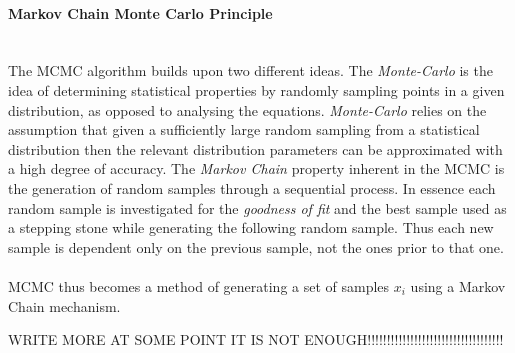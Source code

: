\documentclass[a4paper, 12pt, twoside]{article}
\begin{document}
\paragraph{Markov Chain Monte Carlo Principle}\mbox{}\\
The MCMC algorithm builds upon two different ideas. The \emph{Monte-Carlo} is the idea of determining statistical properties by randomly sampling points in a given distribution, as opposed to analysing the equations. \emph{Monte-Carlo} relies on the assumption that given a sufficiently large random sampling from a statistical distribution then the relevant distribution parameters can be approximated with a high degree of accuracy. The \emph{Markov Chain} property inherent in the MCMC is the generation of random samples through a sequential process. In essence each random sample is investigated for the \emph{goodness of fit} and the best sample used as a stepping stone while generating the following random sample. Thus each new sample is dependent only on the previous sample, not the ones prior to that one. \\
\\
MCMC thus becomes a method of generating a set of samples $x_{i}$ using a Markov Chain mechanism. 

WRITE MORE AT SOME POINT IT IS NOT ENOUGH!!!!!!!!!!!!!!!!!!!!!!!!!!!!!!!!!!!
\end{document}
